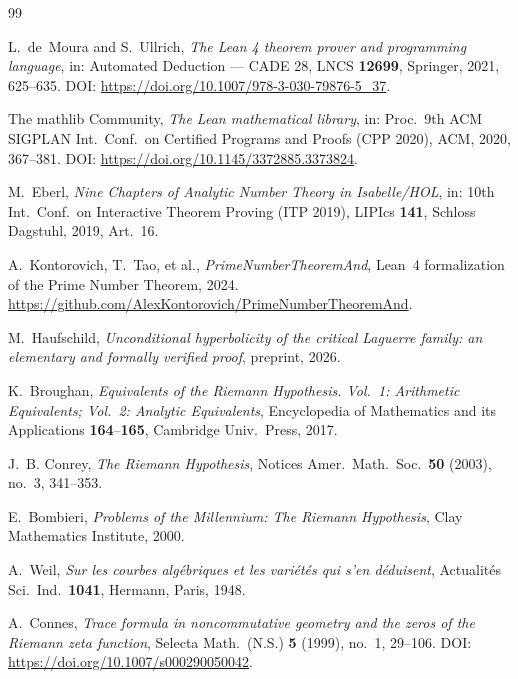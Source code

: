 \documentclass[11pt]{amsart}
\theoremstyle{definition}
\theoremstyle{remark}
\begin{document}
\begin{thebibliography}{99}

L.~de~Moura and S.~Ullrich,
\emph{The Lean 4 theorem prover and programming language},
in: Automated Deduction --- CADE 28, LNCS \textbf{12699}, Springer, 2021,
625--635. DOI: \url{https://doi.org/10.1007/978-3-030-79876-5_37}.

The mathlib Community,
\emph{The Lean mathematical library},
in: Proc.\ 9th ACM SIGPLAN Int.\ Conf.\ on Certified Programs and Proofs
(CPP 2020), ACM, 2020, 367--381. DOI: \url{https://doi.org/10.1145/3372885.3373824}.

M.~Eberl,
\emph{Nine Chapters of Analytic Number Theory in Isabelle/HOL},
in: 10th Int.\ Conf.\ on Interactive Theorem Proving (ITP 2019),
LIPIcs \textbf{141}, Schloss Dagstuhl, 2019, Art.~16.

A.~Kontorovich, T.~Tao, et al.,
\emph{PrimeNumberTheoremAnd}, Lean~4 formalization of the Prime Number Theorem,
2024. \url{https://github.com/AlexKontorovich/PrimeNumberTheoremAnd}.

M.~Haufschild,
\emph{Unconditional hyperbolicity of the critical Laguerre family: an
elementary and formally verified proof}, preprint, 2026.

K.~Broughan,
\emph{Equivalents of the Riemann Hypothesis. Vol.~1: Arithmetic Equivalents;
Vol.~2: Analytic Equivalents}, Encyclopedia of Mathematics and its
Applications \textbf{164}--\textbf{165}, Cambridge Univ.\ Press, 2017.

J.~B. Conrey,
\emph{The Riemann Hypothesis},
Notices Amer.\ Math.\ Soc.\ \textbf{50} (2003), no.\ 3, 341--353.

E.~Bombieri,
\emph{Problems of the Millennium: The Riemann Hypothesis},
Clay Mathematics Institute, 2000.

A.~Weil,
\emph{Sur les courbes alg\'ebriques et les vari\'et\'es qui s'en d\'eduisent},
Actualit\'es Sci.\ Ind.\ \textbf{1041}, Hermann, Paris, 1948.

A.~Connes,
\emph{Trace formula in noncommutative geometry and the zeros of the Riemann
zeta function}, Selecta Math.\ (N.S.) \textbf{5} (1999), no.\ 1, 29--106.
DOI: \url{https://doi.org/10.1007/s000290050042}.

\end{thebibliography}
\end{document}
